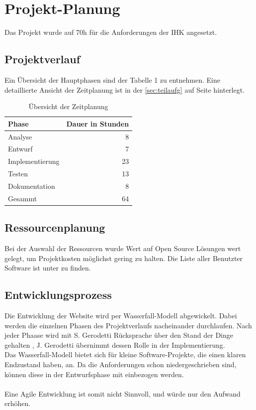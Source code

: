 \documentclass[11pt,a4paper]{article}
\begin{document}
\section{Projekt-Planung}
Das Projekt wurde auf 70h für die Anforderungen der IHK angesetzt. 
\subsection{Projektverlauf}
Ein Übersicht der Hauptphasen sind der Tabelle 1 zu entnehmen. Eine detaillierte Ansicht der Zeitplanung ist in der \ref{sec:teilaufg} auf Seite \pageref{sec:teilaufg} hinterlegt.\\
\begin{table}[!ht]
  \centering
     \begin{tabular}{l|r}
       \textbf{Phase}  & \textbf{Dauer in Stunden} \\
       \hline
      Analyse       & 8                     \\
      Entwurf       & 7             	    \\
      Implementierung       & 23	\\
      Testen       & 13			         \\
       Dokumentation      &  8        \\
       \hline
       \hline
       Gesammt        & 64               \\
     \end{tabular}
     \caption{Übersicht der Zeitplanung}
\label{tbl:Übersicht der Zeitplanung}
\end{table} 
\subsection{Ressourcenplanung}
Bei der Auswahl der Ressourcen wurde Wert auf Open Source Lösungen wert gelegt, um Projektkosten möglichst gering zu halten. Die Liste aller Benutzter Software ist unter %
zu finden.
\subsection{Entwicklungsprozess}
Die Entwicklung der Website wird per Wasserfall-Modell abgewickelt. Dabei werden die einzelnen Phasen des Projektverlaufs nacheinander durchlaufen. Nach jeder Phaase wird mit S. Gerodetti Rücksprache über den Stand der Dinge gehalten , J. Gerodetti übernimmt dessen Rolle in der Implementierung.\\
Das Wasserfall-Modell bietet sich für kleine Software-Projekte, die einen klaren Endzustand haben, an. Da die Anforderungen schon niedergeschrieben sind, können diese in der Entwurfsphase mit einbezogen werden. \\\\
Eine Agile Entwicklung ist somit nicht Sinnvoll, und würde nur den Aufwand erhöhen.
\end{document}
